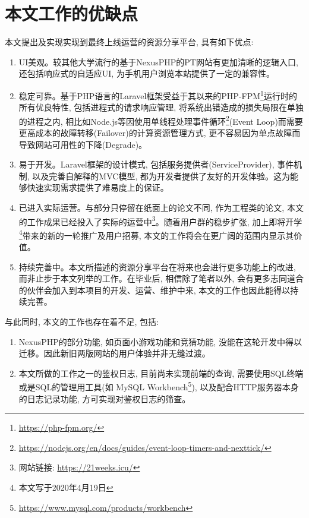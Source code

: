 \section{本文工作的优缺点}

本文提出及实现实现到最终上线运营的资源分享平台, 具有如下优点:

\begin{enumerate}[label=(\arabic*),leftmargin=*]
\item UI美观。较其他大学流行的基于NexusPHP的PT网站有更加清晰的逻辑入口, 还包括响应式的自适应UI, 为手机用户浏览本站提供了一定的兼容性。

\item 稳定可靠。基于PHP语言的Laravel框架受益于其以来的PHP-FPM\footnote{\url{https://php-fpm.org/}}运行时的所有优良特性, 包括进程式的请求响应管理, 将系统出错造成的损失局限在单独的进程之内, 相比如Node.js等因使用单线程处理事件循环\footnote{\url{https://nodejs.org/en/docs/guides/event-loop-timers-and-nexttick/}}(Event Loop)而需要更高成本的故障转移(Failover)的计算资源管理方式, 更不容易因为单点故障而导致网站可用性的下降(Degrade)。

\item 易于开发。Laravel框架的设计模式, 包括服务提供者(ServiceProvider), 事件机制, 以及完善自解释的MVC模型, 都为开发者提供了友好的开发体验。这为能够快速实现需求提供了难易度上的保证。

\item 已进入实际运营。与部分只停留在纸面上的论文不同, 作为工程类的论文, 本文的工作成果已经投入了实际的运营中\footnote{网站链接: \url{https://21weeks.icu/}}。随着用户群的稳步扩张, 加上即将开学\footnote{本文写于2020年4月19日}带来的新的一轮推广及用户招募, 本文的工作将会在更广阔的范围内显示其价值。

\item 持续完善中。本文所描述的资源分享平台在将来也会进行更多功能上的改进, 而非止步于本文列举的工作。在毕业后, 相信除了笔者以外, 会有更多志同道合的伙伴会加入到本项目的开发、运营、维护中来, 本文的工作也因此能得以持续完善。
\end{enumerate}


与此同时, 本文的工作也存在着不足, 包括:
\begin{enumerate}[label=(\arabic*),leftmargin=*]
\item NexusPHP的部分功能, 如页面小游戏功能和竞猜功能, 没能在这轮开发中得以迁移。因此新旧两版网站的用户体验并非无缝过渡。

\item 本文所做的工作之一的鉴权日志, 目前尚未实现前端的查询, 需要使用SQL终端或是SQL的管理用工具(如 MySQL Workbench\footnote{\url{https://www.mysql.com/products/workbench}}), 以及配合HTTP服务器本身的日志记录功能, 方可实现对鉴权日志的筛查。
\end{enumerate}

